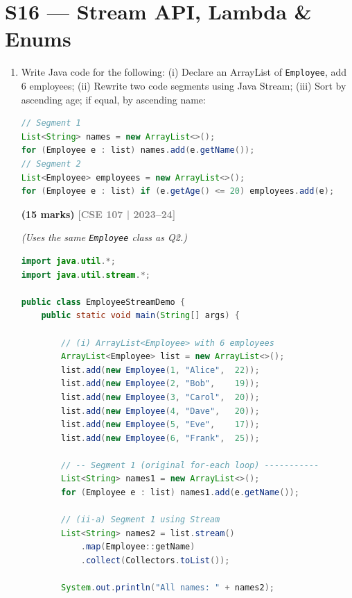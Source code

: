 \documentclass[12pt,a3paper]{article}
\newcommand{\yr}[1]{\hfill\textcolor{gray}{\small\textbf{[#1]}}}
\newcommand{\mk}[1]{\textcolor{orange!70!black}{\small\textbf{(#1 marks)}}}
\begin{document}
\section{S16 --- Stream API, Lambda \& Enums}

\begin{enumerate}
\item Write Java code for the following: (i) Declare an ArrayList of \texttt{Employee}, add 6 employees; (ii) Rewrite two code segments using Java Stream; (iii) Sort by ascending age; if equal, by ascending name:
\begin{lstlisting}[language=Java]
// Segment 1
List<String> names = new ArrayList<>();
for (Employee e : list) names.add(e.getName());
// Segment 2
List<Employee> employees = new ArrayList<>();
for (Employee e : list) if (e.getAge() <= 20) employees.add(e);
\end{lstlisting}
\mk{15}
\yr{CSE 107 | 2023--24}

\begin{tcolorbox}[enhanced,breakable,ansbox,
  colback=cH!4,colframe=cH,boxrule=0.8pt,arc=5pt,
  title={\textbf{Answer — Employee Stream Rewrite and
  Sort}},
  fonttitle=\bfseries\color{white},colbacktitle=cH]

\textit{(Uses the same \texttt{Employee} class as Q2.)}

\begin{lstlisting}[language=Java]
import java.util.*;
import java.util.stream.*;

public class EmployeeStreamDemo {
    public static void main(String[] args) {

        // (i) ArrayList<Employee> with 6 employees
        ArrayList<Employee> list = new ArrayList<>();
        list.add(new Employee(1, "Alice",  22));
        list.add(new Employee(2, "Bob",    19));
        list.add(new Employee(3, "Carol",  20));
        list.add(new Employee(4, "Dave",   20));
        list.add(new Employee(5, "Eve",    17));
        list.add(new Employee(6, "Frank",  25));

        // -- Segment 1 (original for-each loop) -----------
        List<String> names1 = new ArrayList<>();
        for (Employee e : list) names1.add(e.getName());

        // (ii-a) Segment 1 using Stream
        List<String> names2 = list.stream()
            .map(Employee::getName)
            .collect(Collectors.toList());

        System.out.println("All names: " + names2);


\end{lstlisting}
\end{tcolorbox}
\end{enumerate}
\end{document}

